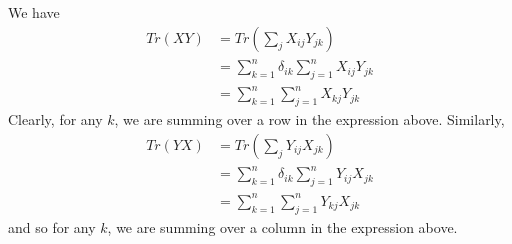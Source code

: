 \documentclass[12pt,onecolumn]{article}
\begin{document}
\begin{answer}
We have
\begin{align*}
    Tr(XY) &= Tr(\sum_j X_{ij}Y_{jk}) \\
    &= \sum_{k=1}^n \delta_{ik}\sum_{j=1}^n X_{ij}Y_{jk} \\
    &= \sum_{k=1}^n\sum_{j=1}^n  X_{kj}Y_{jk}
\end{align*}
Clearly, for any $k$, we are summing over a row in the expression above. Similarly,
\begin{align*}
    Tr(YX) &= Tr(\sum_j Y_{ij}X_{jk}) \\
    &= \sum_{k=1}^n \delta_{ik}\sum_{j=1}^n Y_{ij}X_{jk} \\
    &= \sum_{k=1}^n\sum_{j=1}^n  Y_{kj}X_{jk}
\end{align*}
and so for any $k$, we are summing over a column in the expression above.
\end{answer}
\end{document}
